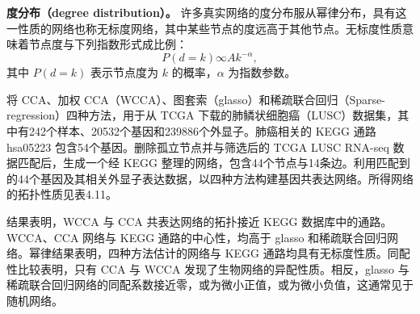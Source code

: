 \par\medskip\noindent\textbf{度分布（degree distribution）。}
许多真实网络的度分布服从幂律分布，具有这一性质的网络也称无标度网络，其中某些节点的度远高于其他节点。无标度性质意味着节点度与下列指数形式成比例：
\[
P(d=k)\infty Ak^{-\alpha},
\]
其中 $P(d=k)$ 表示节点度为 $k$ 的概率，$\alpha$ 为指数参数。

将 CCA、加权 CCA（WCCA）、图套索（glasso）和稀疏联合回归（Sparse-regression）四种方法，用于从 TCGA 下载的肺鳞状细胞癌（LUSC）数据集，其中有242个样本、20532个基因和239886个外显子。肺癌相关的 KEGG 通路 hsa05223 包含54个基因。删除孤立节点并与筛选后的 TCGA LUSC RNA-seq 数据匹配后，生成一个经 KEGG 整理的网络，包含44个节点与14条边。利用匹配到的44个基因及其相关外显子表达数据，以四种方法构建基因共表达网络。所得网络的拓扑性质见表4.11。


结果表明，WCCA 与 CCA 共表达网络的拓扑接近 KEGG 数据库中的通路。WCCA、CCA 网络与 KEGG 通路的中心性，均高于 glasso 和稀疏联合回归网络。幂律结果表明，四种方法估计的网络与 KEGG 通路均具有无标度性质。同配性比较表明，只有 CCA 与 WCCA 发现了生物网络的异配性质。相反，glasso 与稀疏联合回归网络的同配系数接近零，或为微小正值，或为微小负值，这通常见于随机网络。
\FloatBarrier
